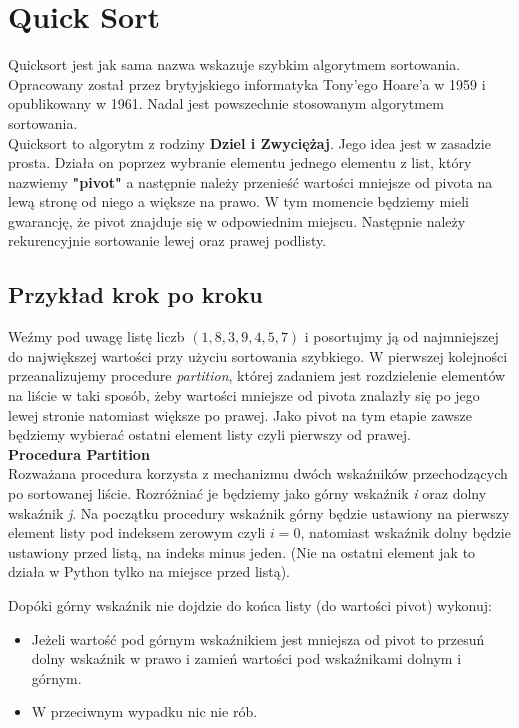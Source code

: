 \documentclass[knowledge.tex]{subfiles}
\begin{document}
    \section{Quick Sort}
    Quicksort jest jak sama nazwa wskazuje szybkim algorytmem sortowania. Opracowany został przez brytyjskiego informatyka Tony'ego Hoare'a w 1959 i opublikowany w 1961. Nadal jest powszechnie stosowanym algorytmem sortowania.\\[0.3cm]
    Quicksort to algorytm z rodziny \textbf{Dziel i Zwyciężaj}. Jego idea jest w zasadzie prosta. Działa on poprzez wybranie elementu jednego elementu z list, który nazwiemy \textbf{"pivot"} a następnie należy przenieść wartości mniejsze od pivota na lewą stronę od niego a większe na prawo. W tym momencie będziemy mieli gwarancję, że pivot znajduje się w odpowiednim miejscu. Następnie należy rekurencyjnie sortowanie lewej oraz prawej podlisty.

    \subsection*{Przykład krok po kroku}
    Weźmy pod uwagę listę liczb $(1, 8, 3, 9, 4, 5, 7)$ i posortujmy ją od najmniejszej do największej wartości przy użyciu sortowania szybkiego. W pierwszej kolejności przeanalizujemy procedure \textit{partition}, której zadaniem jest rozdzielenie elementów na liście w taki sposób, żeby wartości mniejsze od pivota znalazły się po jego lewej stronie natomiast większe po prawej. Jako pivot na tym etapie zawsze będziemy wybierać ostatni element listy czyli pierwszy od prawej.\\[0.3cm]
    \textbf{Procedura Partition}\\[0.3cm]
    Rozważana procedura korzysta z mechanizmu dwóch wskaźników przechodzących po sortowanej liście. Rozróżniać je będziemy jako górny wskaźnik \textit{i} oraz dolny wskaźnik \textit{j}. Na początku procedury wskaźnik górny będzie ustawiony na pierwszy element listy pod indeksem zerowym czyli $i = 0$, natomiast wskaźnik dolny będzie ustawiony przed listą, na indeks minus jeden. (Nie na ostatni element jak to działa w Python tylko na miejsce przed listą).\\[0,3cm]
    
    \begin{definition}
        Dopóki górny wskaźnik nie dojdzie do końca listy (do wartości pivot) wykonuj:
    \begin{itemize}
        \item Jeżeli wartość pod górnym wskaźnikiem jest mniejsza od pivot to przesuń dolny wskaźnik w prawo i zamień wartości pod wskaźnikami dolnym i górnym.
        \item W przeciwnym wypadku nic nie rób.
    \end{itemize}
    \end{definition}
    
\end{document}
